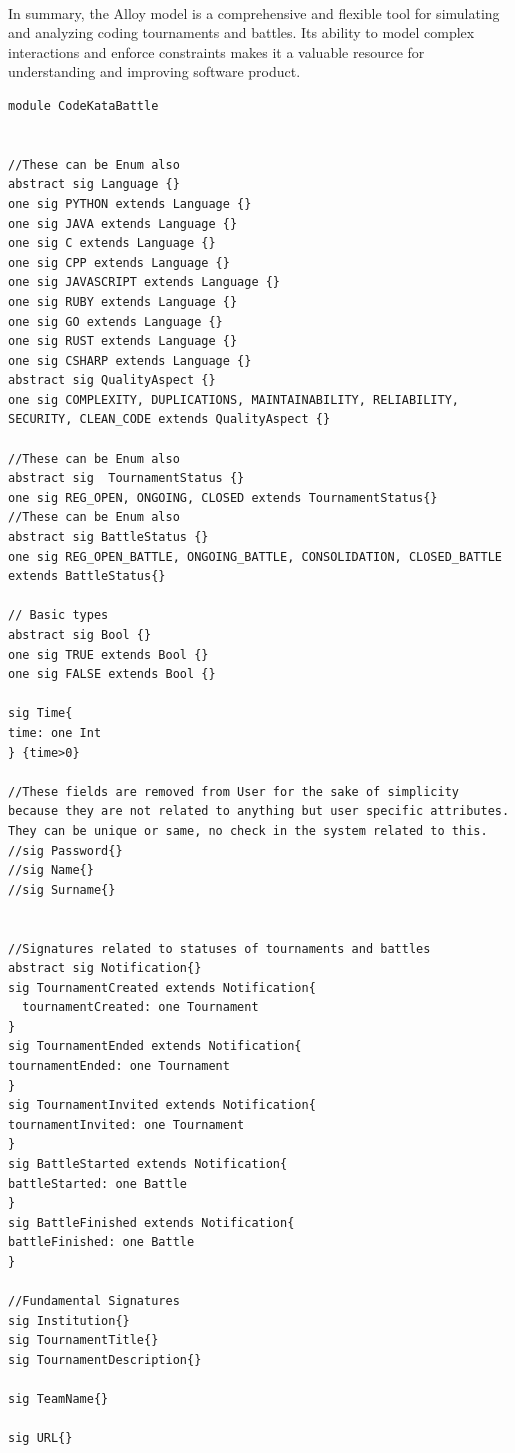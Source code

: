\\
In summary, the Alloy model is a comprehensive and flexible tool for simulating and analyzing coding tournaments and battles. Its ability to model complex interactions and enforce constraints makes it a valuable resource for understanding and improving software product.


    
    \begin{lstlisting}[language=alloy]
module CodeKataBattle


//These can be Enum also 
abstract sig Language {}
one sig PYTHON extends Language {}  
one sig JAVA extends Language {}
one sig C extends Language {}
one sig CPP extends Language {}
one sig JAVASCRIPT extends Language {}
one sig RUBY extends Language {}
one sig GO extends Language {}
one sig RUST extends Language {}
one sig CSHARP extends Language {}
abstract sig QualityAspect {}
one sig COMPLEXITY, DUPLICATIONS, MAINTAINABILITY, RELIABILITY, SECURITY, CLEAN_CODE extends QualityAspect {}

//These can be Enum also
abstract sig  TournamentStatus {}
one sig REG_OPEN, ONGOING, CLOSED extends TournamentStatus{}
//These can be Enum also
abstract sig BattleStatus {}
one sig REG_OPEN_BATTLE, ONGOING_BATTLE, CONSOLIDATION, CLOSED_BATTLE extends BattleStatus{}

// Basic types
abstract sig Bool {}
one sig TRUE extends Bool {} 
one sig FALSE extends Bool {}

sig Time{
time: one Int
} {time>0}

//These fields are removed from User for the sake of simplicity because they are not related to anything but user specific attributes.  They can be unique or same, no check in the system related to this.
//sig Password{}
//sig Name{}
//sig Surname{}


//Signatures related to statuses of tournaments and battles
abstract sig Notification{}
sig TournamentCreated extends Notification{
  tournamentCreated: one Tournament
}
sig TournamentEnded extends Notification{
tournamentEnded: one Tournament
}
sig TournamentInvited extends Notification{
tournamentInvited: one Tournament
}
sig BattleStarted extends Notification{
battleStarted: one Battle
}
sig BattleFinished extends Notification{
battleFinished: one Battle
}

//Fundamental Signatures
sig Institution{}
sig TournamentTitle{}
sig TournamentDescription{}

sig TeamName{}

sig URL{}


\end{lstlisting}
